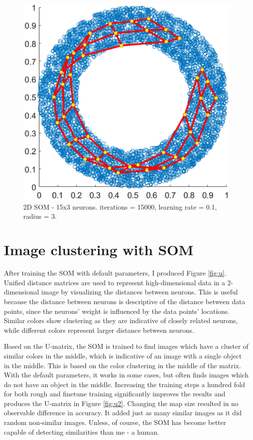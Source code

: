 \documentclass[a4paper,11pt,twocolumn]{article}
\begin{document}
\begin{figure}[!h]
  \centering
  \includegraphics[width=0.8\linewidth]{figures/2d.png}
  \caption{2D SOM - 15x3 neurons. iterations = 15000, learning rate = 0.1, radius = 3.}
  \label{fig:2d}
\end{figure}

\section{Image clustering with SOM}

After training the SOM with default parameters, I produced Figure \ref{fig:u}. Unified distance matrices are used to represent high-dimensional data in a 2-dimensional image by visualizing the distances between neurons. This is useful because the distance between neurons is descriptive of the distance between data points, since the neurons' weight is influenced by the data points' locations. Similar colors show clustering as they are indicative of closely related neurons, while different colors represent larger distance between neurons. 

Based on the U-matrix, the SOM is trained to find images which have a cluster of similar colors in the middle, which is indicative of an image with a single object in the middle. This is based on the color clustering in the middle of the matrix. With the default parameters, it works in some cases, but often finds images which do not have an object in the middle. Increasing the training steps a hundred fold for both rough and finetune training significantly improves the results and produces the U-matrix in  Figure \ref{fig:u2}. Changing the map size resulted in no observable difference in accuracy. It added just as many similar images as it did random non-similar images. Unless, of course, the SOM has become better capable of detecting similarities than me - a human.
\end{document}
